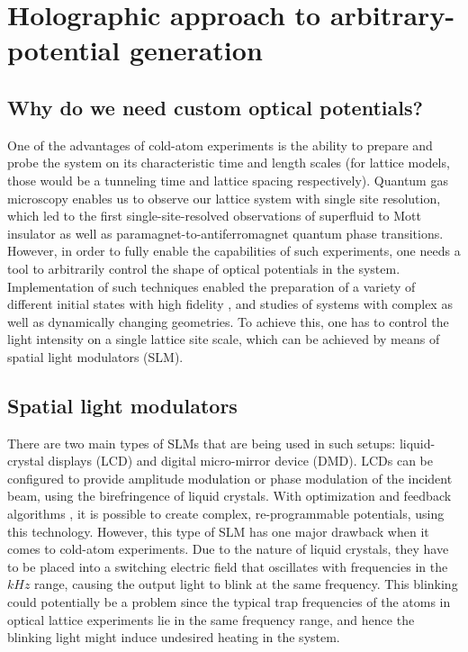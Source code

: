 
\chapter{Holographic approach to arbitrary-potential generation}

\section{Why do we need custom optical potentials?}
One of the advantages of cold-atom experiments is the ability to prepare and probe the system on its characteristic time and length scales (for lattice models, those would be a tunneling time and lattice spacing respectively). Quantum gas microscopy enables us to observe our lattice system with single site resolution, which led to the first single-site-resolved observations of superfluid to Mott insulator \cite{Bakr2010, Sherson2010} as well as paramagnet-to-antiferromagnet \cite{Simon2011, Mazurenko2017} quantum phase transitions. However, in order to fully enable the capabilities of such experiments, one needs a tool to arbitrarily control the shape of optical potentials in the system. Implementation of such techniques enabled the preparation of a variety of different initial states with high fidelity \cite{Preiss2015}, and studies of systems with complex \cite{Husmann2015, Valtolina2015} as well as dynamically changing \cite{Boyer2006} geometries. To achieve this, one has to control the light intensity on a single lattice site scale, which can be achieved by means of spatial light modulators (SLM).

\section{Spatial light modulators}
There are two main types of SLMs that are being used in such setups: liquid-crystal displays (LCD) and digital micro-mirror device (DMD). LCDs can be configured to provide amplitude modulation or phase modulation of the incident beam, using the birefringence of liquid crystals. With optimization and feedback algorithms \cite{Gaunt2012, Nogrette2014}, it is possible to create complex, re-programmable potentials, using this technology. However, this type of SLM has one major drawback when it comes to cold-atom experiments. Due to the nature of liquid crystals, they have to be placed into a switching electric field that oscillates with frequencies in the $kHz$ range, causing the output light to blink at the same frequency. This blinking could potentially be a problem since the typical trap frequencies of the atoms in optical lattice experiments lie in the same frequency range, and hence the blinking light might induce undesired heating in the system.

